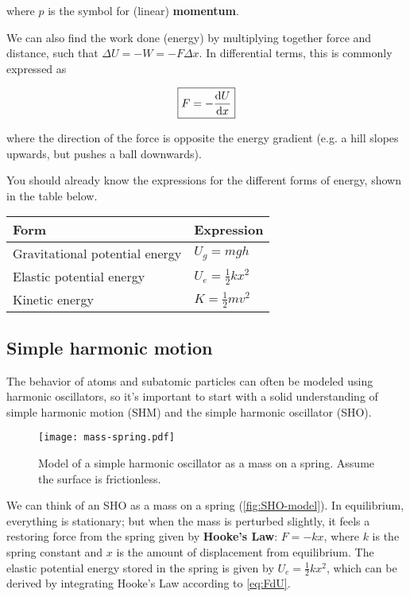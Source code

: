 \noindent where $p$ is the symbol for (linear) \textbf{momentum}.

We can also find the work done (energy) by multiplying together force and distance, such that $\Delta U = -W = -F \Delta x$. 
In differential terms, this is commonly expressed as 

\begin{equation}
	\boxed{F = -\dv{U}{x}} \label{eq:FdU}
\end{equation}

\noindent where the direction of the force is opposite the energy gradient (e.g. a hill slopes upwards, but pushes a ball downwards).

You should already know the expressions for the different forms of energy, shown in the table below.

\begin{table}[!h]
	\renewcommand{\arraystretch}{1.2}
	\centering 
	\begin{tabular}{ll}
		\textbf{Form} & \textbf{Expression} \\ \midrule 
		Gravitational potential energy & $U_g = mgh$ \\ 
		Elastic potential energy & $U_e = \frac{1}{2}kx^2$ \\ 
		Kinetic energy & $K = \frac{1}{2}mv^2$
	\end{tabular}
\end{table} 


\subsection{Simple harmonic motion} \label{sec:shm}

The behavior of atoms and subatomic particles can often be modeled using harmonic oscillators, so it's important to start with a solid understanding of simple harmonic motion (SHM) and the simple harmonic oscillator (SHO). 

\begin{figure}[!h]
	\centering
	\texttt{[image: mass-spring.pdf]}
	\caption{Model of a simple harmonic oscillator as a mass on a spring.
	Assume the surface is frictionless.}
	\label{fig:SHO-model}
\end{figure} 

We can think of an SHO as a mass on a spring (\autoref{fig:SHO-model}). 
In equilibrium, everything is stationary; but when the mass is perturbed slightly, it feels a restoring force from the spring given by \textbf{Hooke's Law}: $F=-kx$, where $k$ is the spring constant and $x$ is the amount of displacement from equilibrium. 
The elastic potential energy stored in the spring is given by $U_e=\frac{1}{2}kx^2$, which can be derived by integrating Hooke's Law according to \autoref{eq:FdU}.

